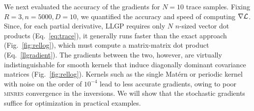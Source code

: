 \documentclass{article}
\begin{document}
We next evaluated the accuracy of the gradients for $N=10$ trace samples. Fixing $R=3,n=5000,D=10$, we quantified the accuracy and speed of computing $\nabla\mathcal{L}$. Since, for each partial derivative, LLGP requires only $N$ $n$-sized vector dot products (Eq.~\ref{eq:trace}), it generally runs faster than the exact approach (Fig.~\ref{fig:rellog}), which must compute a matrix-matrix dot product (Eq.~\ref{llgradient}). The gradients between the two, however, are virtually indistinguishable for smooth kernels that induce diagonally dominant covariance matrices (Fig.~\ref{fig:rellog}). Kernels such as the single Mat\'{e}rn or periodic kernel with noise on the order of $10^{-4}$ lead to less accurate gradients, owing to poor \textsc{minres} convergence in the inversions. We will show that the stochastic gradients suffice for optimization in practical examples.
\end{document}
